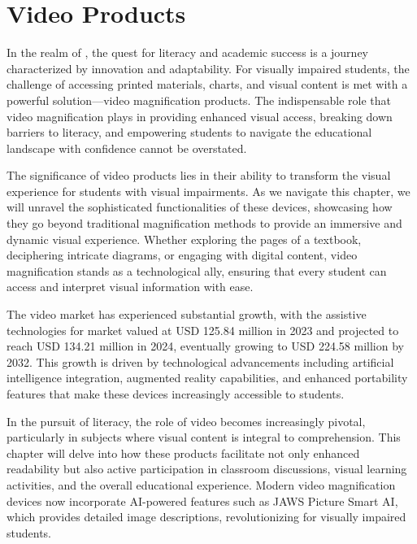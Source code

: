\chapter{Video  Products}\label{ch6:chap:video-magnification}
\raggedright
In the realm of , the quest for literacy and academic success is a journey characterized by innovation and adaptability. For visually impaired students, the challenge of accessing printed materials, charts, and visual content is met with a powerful solution—video magnification products. The indispensable role that video magnification plays in providing enhanced visual access, breaking down barriers to literacy, and empowering students to navigate the educational landscape with confidence cannot be overstated.\supercite{PerkinsVideoMagnifier, AFBMagnification}

The significance of video  products lies in their ability to transform the visual experience for students with visual impairments. As we navigate this chapter, we will unravel the sophisticated functionalities of these devices, showcasing how they go beyond traditional magnification methods to provide an immersive and dynamic visual experience. Whether exploring the pages of a textbook, deciphering intricate diagrams, or engaging with digital content, video magnification stands as a technological ally, ensuring that every student can access and interpret visual information with ease.

The video  market has experienced substantial growth, with the assistive technologies for  market valued at USD 125.84 million in 2023 and projected to reach USD 134.21 million in 2024, eventually growing to USD 224.58 million by 2032. This growth is driven by technological advancements including artificial intelligence integration, augmented reality capabilities, and enhanced portability features that make these devices increasingly accessible to students.\supercite{BrailleMarketResearch}

In the pursuit of literacy, the role of video  becomes increasingly pivotal, particularly in subjects where visual content is integral to comprehension. This chapter will delve into how these products facilitate not only enhanced readability but also active participation in classroom discussions, visual learning activities, and the overall educational experience. Modern video magnification devices now incorporate AI-powered features such as JAWS Picture Smart AI, which provides detailed image descriptions, revolutionizing  for visually impaired students.\supercite{JAWSAILabeler, msseeingai}

